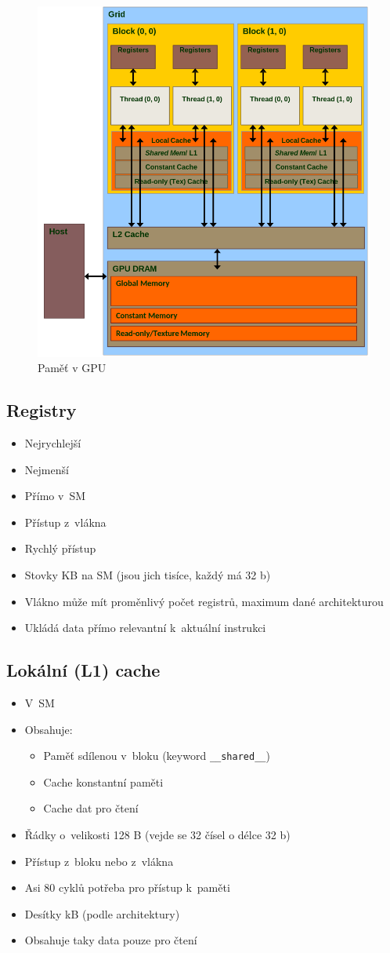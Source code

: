 \begin{figure}
    \centering
    \includegraphics[width=0.6\linewidth]{pict/mem.png}
    \caption{Paměť v GPU}
    \label{fig:enter-label}
\end{figure}
\subsection{Registry}
\begin{itemize}
    \item Nejrychlejší
    \item Nejmenší
    \item Přímo v~SM
    \item Přístup z~vlákna
    \item Rychlý přístup
    \item Stovky KB na SM (jsou jich tisíce, každý má 32 b)
    \item Vlákno může mít proměnlivý počet registrů, maximum dané architekturou
    \item Ukládá data přímo relevantní k~aktuální instrukci
\end{itemize}

\subsection{Lokální (L1) cache}
\begin{itemize}
    \item V~SM
    \item Obsahuje:
    \begin{itemize}
        \item Paměť sdílenou v~bloku (keyword \texttt{\_\_shared\_\_})
        \item Cache konstantní paměti
        \item Cache dat pro čtení
    \end{itemize}
    \item Řádky o~velikosti 128 B (vejde se 32 čísel o délce 32 b)
    \item Přístup z~bloku nebo z~vlákna
    \item Asi 80 cyklů potřeba pro přístup k~paměti
    \item Desítky kB (podle architektury)
    \item Obsahuje taky data pouze pro čtení
\end{itemize}

